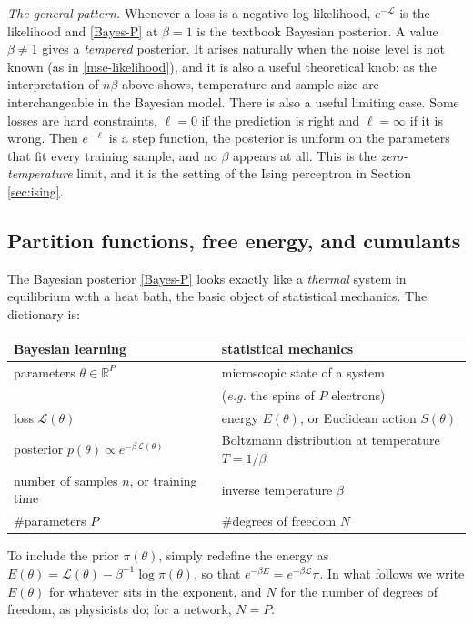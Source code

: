 \documentclass[11pt]{article}
\newcommand{\R}{\mathbb{R}}
\newcommand{\CL}{{\mathcal L}}
\begin{document}
\emph{The general pattern.} Whenever a loss is a negative log-likelihood, $e^{-\CL}$ is the likelihood and \eqref{Bayes-P} at $\beta=1$ is the textbook Bayesian posterior. A value $\beta\neq 1$ gives a \emph{tempered} posterior. It arises naturally when the noise level is not known (as in \eqref{mse-likelihood}), and it is also a useful theoretical knob: as the interpretation of $n\beta$ above shows, temperature and sample size are interchangeable in the Bayesian model. There is also a useful limiting case. Some losses are hard constraints, $\ell = 0$ if the prediction is right and $\ell=\infty$ if it is wrong. Then $e^{-\ell}$ is a step function, the posterior is uniform on the parameters that fit every training sample, and no $\beta$ appears at all. This is the \emph{zero-temperature} limit, and it is the setting of the Ising perceptron in Section \ref{sec:ising}.

\subsection{Partition functions, free energy, and cumulants}
\label{sec:dictionary}

The Bayesian posterior \eqref{Bayes-P} looks exactly like a \emph{thermal} system in equilibrium with a heat bath, the basic object of statistical mechanics. The dictionary is:
%
\begin{center}
\small
\renewcommand{\arraystretch}{1.3}
\begin{tabular}{l|l}
    \textbf{Bayesian learning} & \textbf{statistical mechanics} \\\hline
    parameters $\theta\in\R^P$ & microscopic state of a system \\
    & (\emph{e.g.} the spins of $P$ electrons) \\
    loss $\CL(\theta)$ & energy $E(\theta)$, or Euclidean action $S(\theta)$ \\
    posterior $p(\theta)\propto e^{-\beta\CL(\theta)}$ & Boltzmann distribution at temperature $T=1/\beta$ \\
    number of samples $n$, or training time & inverse temperature $\beta$ \\
    \#parameters $P$ & \#degrees of freedom $N$
\end{tabular}
\end{center}
%
To include the prior $\pi(\theta)$, simply redefine the energy as $E(\theta) = \CL(\theta) - \beta^{-1}\log\pi(\theta)$, so that $e^{-\beta E} = e^{-\beta\CL}\pi$. In what follows we write $E(\theta)$ for whatever sits in the exponent, and $N$ for the number of degrees of freedom, as physicists do; for a network, $N=P$.
\end{document}
